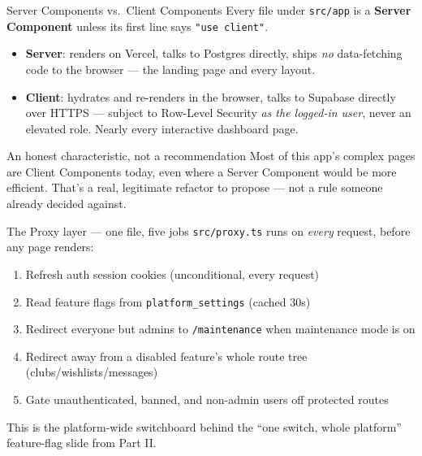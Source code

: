 \documentclass[aspectratio=169,11pt]{beamer}
\newcommand{\code}[1]{\textcolor{olkTealDark}{\texttt{#1}}}
\begin{document}
\begin{frame}{Server Components vs.\ Client Components}
  Every file under \code{src/app} is a \textbf{Server Component} unless its first line says \code{"use client"}.
  \begin{itemize}
    \item \textbf{Server}: renders on Vercel, talks to Postgres directly, ships \emph{no} data-fetching code to the browser --- the landing page and every layout.
    \item \textbf{Client}: hydrates and re-renders in the browser, talks to Supabase directly over HTTPS --- subject to Row-Level Security \emph{as the logged-in user}, never an elevated role. Nearly every interactive dashboard page.
  \end{itemize}
  \vfill
  \begin{alertblock}{An honest characteristic, not a recommendation}
    Most of this app's complex pages are Client Components today, even where a Server Component would be more efficient. That's a real, legitimate refactor to propose --- not a rule someone already decided against.
  \end{alertblock}
\end{frame}

\begin{frame}[fragile]{The Proxy layer --- one file, five jobs}
  \code{src/proxy.ts} runs on \emph{every} request, before any page renders:
  \begin{enumerate}
    \item Refresh auth session cookies (unconditional, every request)
    \item Read feature flags from \code{platform\_settings} (cached 30s)
    \item Redirect everyone but admins to \code{/maintenance} when maintenance mode is on
    \item Redirect away from a disabled feature's whole route tree (clubs/wishlists/messages)
    \item Gate unauthenticated, banned, and non-admin users off protected routes
  \end{enumerate}
  \vfill
  \small This is the platform-wide switchboard behind the ``one switch, whole platform'' feature-flag slide from Part II.
\end{frame}
\end{document}
